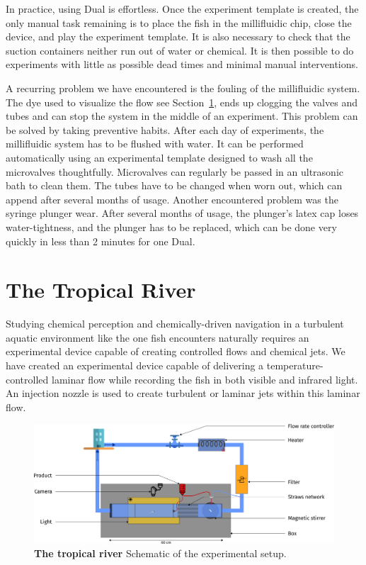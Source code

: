   In practice, using Dual is effortless. Once the experiment template is created, the only manual task remaining is to place the fish in the millifluidic chip, close the device, and play the experiment template. It is also necessary to check that the suction containers neither run out of water or chemical. It is then possible to do experiments with little as possible dead times and minimal manual interventions.

  A recurring problem we have encountered is the fouling of the millifluidic system. The dye used to visualize the flow see Section~\ref{}, ends up clogging the valves and tubes and can stop the system in the middle of an experiment. This problem can be solved by taking preventive habits. After each day of experiments, the millifluidic system has to be flushed with water. It can be performed automatically using an experimental template designed to wash all the microvalves thoughtfully. Microvalves can regularly be passed in an ultrasonic bath to clean them. The tubes have to be changed when worn out, which can append after several months of usage. Another encountered problem was the syringe plunger wear. After several months of usage, the plunger's latex cap loses water-tightness, and the plunger has to be replaced, which can be done very quickly in less than 2 minutes for one Dual.


    \section{The Tropical River}
  Studying chemical perception and chemically-driven navigation in a turbulent aquatic environment like the one fish encounters naturally requires an experimental device capable of creating controlled flows and chemical jets. We have created an experimental device capable of delivering a temperature-controlled laminar flow while recording the fish in both visible and infrared light. An injection nozzle is used to create turbulent or laminar jets within this laminar flow.

    \begin{figure}[h]
      \centering
      \includegraphics[width=1\textwidth]{part_2/assets/river.png}
      \caption{\textbf{The tropical river} Schematic of the experimental setup.}
      \label{river}
    \end{figure}

